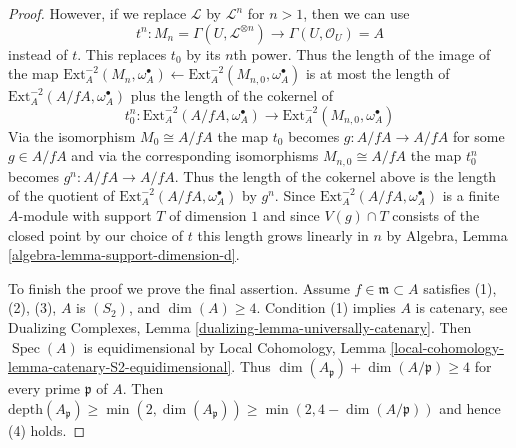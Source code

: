\documentclass[10pt,a4paper]{amsart}
\theoremstyle{plain}
\theoremstyle{definition}
\theoremstyle{remark}
\numberwithin{equation}{subsection}
\def\Spec{\mathop{\mathrm{Spec}}}
\begin{document}
\begin{proof}
\medskip\noindent
However, if we replace $\mathcal{L}$ by $\mathcal{L}^n$ for $n > 1$,
then we can use
$$
t^n :
M_n = \Gamma(U, \mathcal{L}^{\otimes n})
\longrightarrow
\Gamma(U, \mathcal{O}_U) = A
$$
instead of $t$. This replaces $t_0$ by its $n$th power.
Thus the length of the image of the map
$\text{Ext}^{-2}_A(M_n, \omega_A^\bullet) \leftarrow
\text{Ext}^{-2}_A(M_{n, 0}, \omega_A^\bullet)$
is at most the length of $\text{Ext}^{-2}_A(A/fA, \omega_A^\bullet)$
plus the length of the cokernel of
$$
t_0^n : 
\text{Ext}^{-2}_A(A/fA, \omega_A^\bullet)
\longrightarrow
\text{Ext}^{-2}_A(M_{n, 0}, \omega_A^\bullet)
$$
Via the isomorphism $M_0 \cong A/fA$ the map $t_0$ becomes
$g : A/fA \to A/fA$ for some $g \in A/fA$ and via the corresponding
isomorphisms $M_{n, 0} \cong A/fA$ the map $t_0^n$ becomes
$g^n : A/fA \to A/fA$. Thus the length of the cokernel above
is the length of the quotient of
$\text{Ext}^{-2}_A(A/fA, \omega_A^\bullet)$ by $g^n$.
Since $\text{Ext}^{-2}_A(A/fA, \omega_A^\bullet)$ is a finite $A$-module
with support $T$ of dimension $1$ and since $V(g) \cap T$
consists of the closed point by our choice of $t$
this length grows linearly in $n$ by
Algebra, Lemma \ref{algebra-lemma-support-dimension-d}.

\medskip\noindent
To finish the proof we prove the final assertion. Assume
$f \in \mathfrak m \subset A$ satisfies
(1), (2), (3), $A$ is $(S_2)$, and $\dim(A) \geq 4$.
Condition (1) implies $A$ is catenary, see
Dualizing Complexes, Lemma \ref{dualizing-lemma-universally-catenary}.
Then $\Spec(A)$ is equidimensional by Local Cohomology, Lemma
\ref{local-cohomology-lemma-catenary-S2-equidimensional}.
Thus $\dim(A_\mathfrak p) + \dim(A/\mathfrak p) \geq 4$
for every prime $\mathfrak p$ of $A$. Then
$\text{depth}(A_\mathfrak p) \geq \min(2, \dim(A_\mathfrak p))
\geq \min(2, 4 - \dim(A/\mathfrak p))$ and hence (4) holds.
\end{proof}



\end{document}
